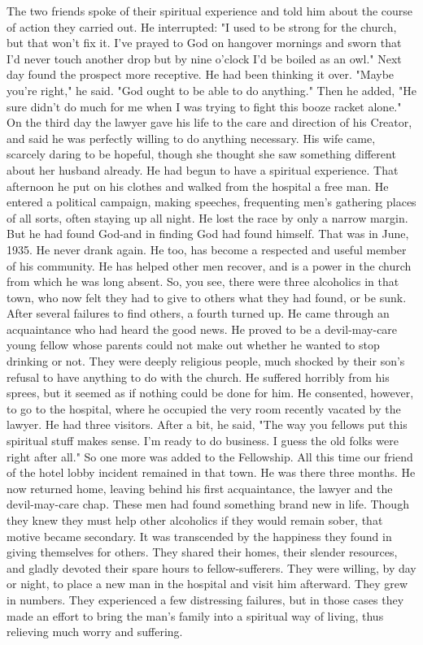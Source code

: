 \begin{biblechapter}
The two friends spoke of their spiritual experience and told him about the course of action they carried out.
He interrupted: "I used to be strong for the church, but that won't fix it.  I've prayed to God on hangover mornings and sworn that I'd never touch another drop but by nine o'clock I'd be boiled as an owl."
Next day found the prospect more receptive.  He had been thinking it over.  "Maybe you're right," he said.  "God ought to be able to do anything."  Then he added, "He sure didn't do much for me when I was trying to fight this booze racket alone."
On the third day the lawyer gave his life to the care and direction of his Creator, and said he was perfectly willing to do anything necessary.  His wife came, scarcely daring to be hopeful, though she thought she saw something different about her husband already.  He had begun to have a spiritual experience.
That afternoon he put on his clothes and walked from the hospital a free man.  He entered a political campaign, making speeches, frequenting men's gathering places of all sorts, often staying up all night.  He lost the race by only a narrow margin.  But he had found God-and in finding God had found himself.
That was in June, 1935.  He never drank again.  He too, has become a respected and useful member of his community.  He has helped other men recover, and is a power in the church from which he was long absent.
So, you see, there were three alcoholics in that town, who now felt they had to give to others what they had found, or be sunk.  After several failures to find others, a fourth turned up.  He came through an acquaintance who had heard the good news.  He proved to be a devil-may-care young fellow whose parents could not make out whether he wanted to stop drinking or not.  They were deeply religious people, much shocked by their son's refusal to have anything to do with the church.  He suffered horribly from his sprees, but it seemed as if nothing could be done for him.  He consented, however, to go to the hospital, where he occupied the very room recently vacated by the lawyer.
He had three visitors.  After a bit, he said, "The way you fellows put this spiritual stuff makes sense.  I'm ready to do business.  I guess the old folks were right after all."  So one more was added to the Fellowship.
All this time our friend of the hotel lobby incident remained in that town.  He was there three months.  He now returned home, leaving behind his first acquaintance, the lawyer and the devil-may-care chap.  These men had found something brand new in life.  Though they knew they must help other alcoholics if they would remain sober, that motive became secondary.  It was transcended by the happiness they found in giving  themselves for others.  They shared their homes, their slender resources, and gladly devoted their spare hours to fellow-sufferers.  They were willing, by day or night, to place a new man in the hospital and visit him afterward.  They grew in numbers.  They experienced a few distressing failures, but in those cases they made an effort to bring the man's family into a spiritual way of living, thus relieving much worry and suffering.

\end{biblechapter}
